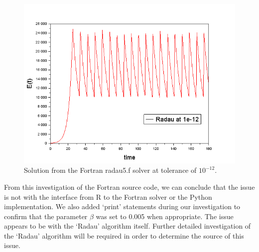 \begin{figure}[h]
\centering
\includegraphics[width=0.7\linewidth]{./figures/fortran_radau_tol_12}
\caption{Solution from the Fortran radau5.f solver at tolerance of $10^{-12}$.}
\label{fig:fortran_radau_tol_12}
\end{figure}

From this investigation of the Fortran source code, we can conclude that the issue is not with the interface from R to the Fortran solver or the Python implementation. We also added `print' statements during our investigation to confirm that the parameter $\beta$ was set to 0.005 when appropriate. The issue appears to be with the `Radau' algorithm itself. Further detailed investigation of the `Radau' algorithm will be required in order to determine the source of this issue.
